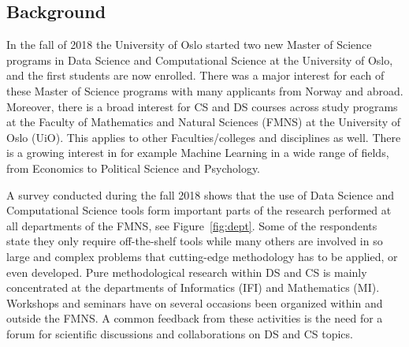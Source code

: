 \documentclass[a4paper,10pt]{article}
\begin{document}
\subsection{Background}
In the fall of 2018 the University of Oslo started two new Master of Science  programs in Data Science and Computational Science at the University of Oslo, and the first students are now enrolled. There was a major interest for each of these Master of Science programs with many applicants from Norway and abroad. Moreover, there is  a  broad interest for CS  and DS courses 
across study programs at the Faculty of Mathematics and Natural Sciences (FMNS) at the University of Oslo (UiO). This applies to other Faculties/colleges and disciplines as well. There is a growing interest in for example Machine Learning in a wide range of fields, from Economics to Political Science and Psychology. 

A survey conducted during the fall 2018 shows that the use of Data Science and Computational Science tools form important parts of the research performed at all departments of the FMNS, see Figure~\ref{fig:dept}. Some of the respondents state they only require off-the-shelf tools while many others are involved in so large and complex problems that cutting-edge methodology has to be applied, or even developed. Pure methodological research within DS and CS is mainly concentrated at the departments of Informatics (IFI) and Mathematics (MI). Workshops and seminars have on several occasions been organized within and outside the FMNS. A common feedback from these activities is the need for a forum for scientific discussions and collaborations on DS and CS topics.
\end{document}
